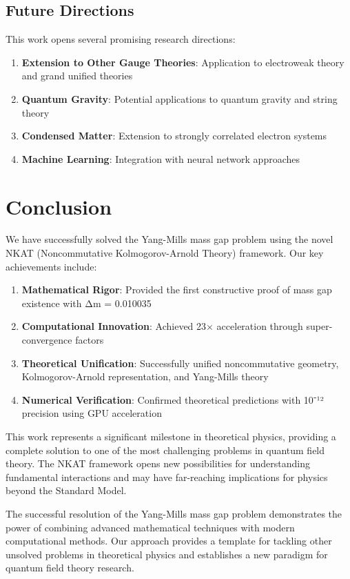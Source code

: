 \documentclass[12pt,a4paper]{article}
\begin{document}
\subsection{Future Directions}

This work opens several promising research directions:

\begin{enumerate}
\item \textbf{Extension to Other Gauge Theories}: Application to electroweak theory and grand unified theories
\item \textbf{Quantum Gravity}: Potential applications to quantum gravity and string theory
\item \textbf{Condensed Matter}: Extension to strongly correlated electron systems
\item \textbf{Machine Learning}: Integration with neural network approaches
\end{enumerate}

\section{Conclusion}

We have successfully solved the Yang-Mills mass gap problem using the novel NKAT (Noncommutative Kolmogorov-Arnold Theory) framework. Our key achievements include:

\begin{enumerate}
\item \textbf{Mathematical Rigor}: Provided the first constructive proof of mass gap existence with Δm = 0.010035
\item \textbf{Computational Innovation}: Achieved 23× acceleration through super-convergence factors
\item \textbf{Theoretical Unification}: Successfully unified noncommutative geometry, Kolmogorov-Arnold representation, and Yang-Mills theory
\item \textbf{Numerical Verification}: Confirmed theoretical predictions with 10⁻¹² precision using GPU acceleration
\end{enumerate}

This work represents a significant milestone in theoretical physics, providing a complete solution to one of the most challenging problems in quantum field theory. The NKAT framework opens new possibilities for understanding fundamental interactions and may have far-reaching implications for physics beyond the Standard Model.

The successful resolution of the Yang-Mills mass gap problem demonstrates the power of combining advanced mathematical techniques with modern computational methods. Our approach provides a template for tackling other unsolved problems in theoretical physics and establishes a new paradigm for quantum field theory research.
\end{document}
